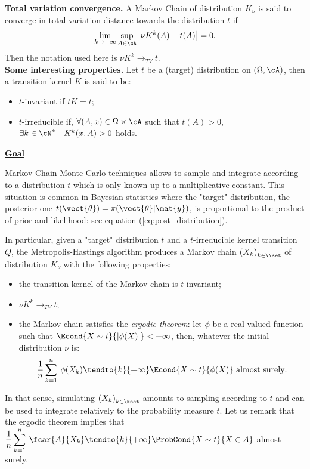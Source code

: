 {  \textbf{Total variation convergence.} A Markov Chain of distribution $K_\nu$ is said
  to converge in total variation distance towards the distribution $t$ if
  \begin{align*}
    \lim_{k\to+\infty} \sup_{A\in\cA} \left|
    \nu{}K^k(A) - t(A)
    \right| = 0.
  \end{align*}
  Then the notation used here is $\nu{}K^k \rightarrow_{TV} t$.\\

  \textbf{Some interesting properties.} Let $t$ be a (target) distribution
  on $(\Omega, \cA)$, then a transition kernel $K$ is said to be:
  \begin{itemize}
  \item $t$-invariant if $t{}K = t$;
  \item $t$-irreducible if, $\forall(A,x)\in\Omega\times\cA$ such that $t(A)>0$,
    $\exists{}k\in\cN^* \quad {}K^k(x, A) > 0$ holds.
  \end{itemize}


  \underline{\textbf{Goal}} \vspace{2mm}

  Markov Chain Monte-Carlo techniques allows to sample and integrate according to a distribution
  $t$ which is only known up to a multiplicative constant.
  This situation is common in
  Bayesian statistics where the "target" distribution, the posterior one
  $t(\vect{\theta})=\pi(\vect{\theta} | \mat{y})$, is proportional to
  the product of prior and likelihood: see equation (\ref{eq:post_distribution}).

  In particular, given a "target" distribution $t$ and a $t$-irreducible kernel transition $Q$,
  the Metropolis-Hastings algorithm produces a Markov chain ${(X_k)}_{k\in\Nset}$ of distribution
  $K_\nu$ with the following properties:
  \begin{itemize}
  \item the transition kernel of the Markov chain is $t$-invariant;
  \item $\nu{}K^k \rightarrow_{TV} t$;
  \item the Markov chain satisfies the \emph{ergodic theorem}: let $\phi$ be a real-valued
    function such that $\Econd{X\sim{}t}{|\phi(X)|}<+\infty$, then, whatever the initial distribution
    $\nu$ is:
    \begin{align*}
      \displaystyle\frac{1}{n} \sum_{k=1}^n \: \phi(X_k) \tendto{k}{+\infty} \Econd{X\sim{}t}{\phi(X)}
      \mbox{ almost surely}.
    \end{align*}
  \end{itemize}
  In that sense, simulating ${(X_k)}_{k\in\Nset}$ amounts to
  sampling according to $t$ and can be used to integrate
  relatively to the probability measure $t$.
  Let us remark that the ergodic theorem implies that
  $\displaystyle\frac{1}{n} \sum_{k=1}^n \: \fcar{A}{X_k}
  \tendto{k}{+\infty} \ProbCond{X\sim{}t}{X\in{}A}$ almost surely.

}
